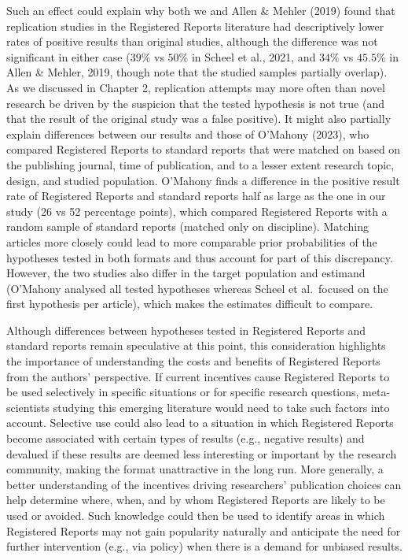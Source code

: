 \documentclass[
  ,man,mask,floatsintext]{apa6}
\begin{document}
Such an effect could explain why both we and Allen \& Mehler (2019) found that replication studies in the Registered Reports literature had descriptively lower rates of positive results than original studies, although the difference was not significant in either case (\(39\%\) vs \(50\%\) in Scheel et al., 2021, and \(34\%\) vs \(45.5\%\) in Allen \& Mehler, 2019, though note that the studied samples partially overlap).
As we discussed in Chapter 2, replication attempts may more often than novel research be driven by the suspicion that the tested hypothesis is not true (and that the result of the original study was a false positive).
It might also partially explain differences between our results and those of O'Mahony (2023), who compared Registered Reports to standard reports that were matched on based on the publishing journal, time of publication, and to a lesser extent research topic, design, and studied population.
O'Mahony finds a difference in the positive result rate of Registered Reports and standard reports half as large as the one in our study (26 vs 52 percentage points), which compared Registered Reports with a random sample of standard reports (matched only on discipline).
Matching articles more closely could lead to more comparable prior probabilities of the hypotheses tested in both formats and thus account for part of this discrepancy.
However, the two studies also differ in the target population and estimand (O'Mahony analysed all tested hypotheses whereas Scheel et al.~focused on the first hypothesis per article), which makes the estimates difficult to compare.

Although differences between hypotheses tested in Registered Reports and standard reports remain speculative at this point, this consideration highlights the importance of understanding the costs and benefits of Registered Reports from the authors' perspective.
If current incentives cause Registered Reports to be used selectively in specific situations or for specific research questions, meta-scientists studying this emerging literature would need to take such factors into account.
Selective use could also lead to a situation in which Registered Reports become associated with certain types of results (e.g., negative results) and devalued if these results are deemed less interesting or important by the research community, making the format unattractive in the long run.
More generally, a better understanding of the incentives driving researchers' publication choices can help determine where, when, and by whom Registered Reports are likely to be used or avoided.
Such knowledge could then be used to identify areas in which Registered Reports may not gain popularity naturally and anticipate the need for further intervention (e.g., via policy) when there is a demand for unbiased results.
\end{document}
